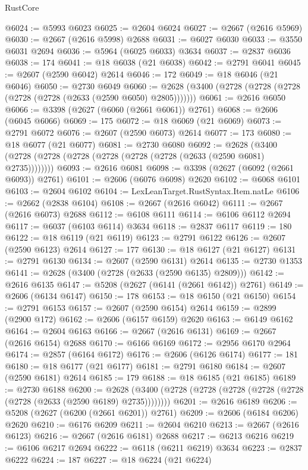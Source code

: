 \begin{lexlean}{RustCore}
\begin{coremodule}
@6024 := @5993 @6023
@6025 := @2604 @6024
@6027 := @2667 (@2616 @5969)
@6030 := @2667 (@2616 @5998) @2688
@6031 := @6027 @6030
@6033 := @3550 @6031 @2694
@6036 := @5964 (@6025 @6033) @3634
@6037 := @2837 @6036
@6038 := 174
@6041 := @18 @6038 (@21 @6038)
@6042 := @2791 @6041
@6045 := @2607 (@2590 @6042) @2614
@6046 := 172
@6049 := @18 @6046 (@21 @6046)
@6050 := @2730 @6049
@6060 := @2628 (@3400 (@2728 (@2728 (@2728 (@2728 (@2728 (@2633 (@2590 @6050) @2805)))))))
@6061 := @2616 @6050
@6066 := @3398 (@2627 (@6060 (@2661 @6061)) @2761)
@6068 := @2606 (@6045 @6066)
@6069 := 175
@6072 := @18 @6069 (@21 @6069)
@6073 := @2791 @6072
@6076 := @2607 (@2590 @6073) @2614
@6077 := 173
@6080 := @18 @6077 (@21 @6077)
@6081 := @2730 @6080
@6092 := @2628 (@3400 (@2728 (@2728 (@2728 (@2728 (@2728 (@2728 (@2633 (@2590 @6081) @2735))))))))
@6093 := @2616 @6081
@6098 := @3398 (@2627 (@6092 (@2661 @6093)) @2761)
@6101 := @2606 (@6076 @6098) @2620
@6102 := @6068 @6101
@6103 := @2604 @6102
@6104 := LexLeanTarget.RustSyntax.Item.natLe
@6106 := @2662 (@2838 @6104)
@6108 := @2667 (@2616 @6042)
@6111 := @2667 (@2616 @6073) @2688
@6112 := @6108 @6111
@6114 := @6106 @6112 @2694
@6117 := @6037 (@6103 @6114) @3634
@6118 := @2837 @6117
@6119 := 180
@6122 := @18 @6119 (@21 @6119)
@6123 := @2791 @6122
@6126 := @2607 (@2590 @6123) @2614
@6127 := 177
@6130 := @18 @6127 (@21 @6127)
@6131 := @2791 @6130
@6134 := @2607 (@2590 @6131) @2614
@6135 := @2730 @1353
@6141 := @2628 (@3400 (@2728 (@2633 (@2590 @6135) @2809)))
@6142 := @2616 @6135
@6147 := @5208 (@2627 (@6141 (@2661 @6142)) @2761)
@6149 := @2606 (@6134 @6147)
@6150 := 178
@6153 := @18 @6150 (@21 @6150)
@6154 := @2791 @6153
@6157 := @2607 (@2590 @6154) @2614
@6159 := @2899 (@2900 @172)
@6162 := @2606 (@6157 @6159) @2620
@6163 := @6149 @6162
@6164 := @2604 @6163
@6166 := @2667 (@2616 @6131)
@6169 := @2667 (@2616 @6154) @2688
@6170 := @6166 @6169
@6172 := @2956 @6170 @2964
@6174 := @2857 (@6164 @6172)
@6176 := @2606 (@6126 @6174)
@6177 := 181
@6180 := @18 @6177 (@21 @6177)
@6181 := @2791 @6180
@6184 := @2607 (@2590 @6181) @2614
@6185 := 179
@6188 := @18 @6185 (@21 @6185)
@6189 := @2730 @6188
@6200 := @2628 (@3400 (@2728 (@2728 (@2728 (@2728 (@2728 (@2728 (@2633 (@2590 @6189) @2735))))))))
@6201 := @2616 @6189
@6206 := @5208 (@2627 (@6200 (@2661 @6201)) @2761)
@6209 := @2606 (@6184 @6206) @2620
@6210 := @6176 @6209
@6211 := @2604 @6210
@6213 := @2667 (@2616 @6123)
@6216 := @2667 (@2616 @6181) @2688
@6217 := @6213 @6216
@6219 := @6106 @6217 @2694
@6222 := @6118 (@6211 @6219) @3634
@6223 := @2837 @6222
@6224 := 187
@6227 := @18 @6224 (@21 @6224)

\end{coremodule}
\end{lexlean}
